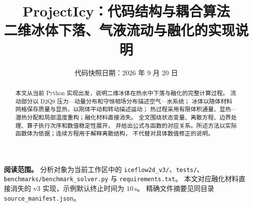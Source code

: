 \documentclass[UTF8,11pt,a4paper,fontset=none]{ctexart}
\title{\vspace{-12mm}\textbf{ProjectIcy：代码结构与耦合算法}\\[4mm]
  \large 二维冰体下落、气液流动与融化的实现说明}
\author{}
\date{代码快照日期：2026 年 9 月 20 日}
\newcommand{\code}[1]{\nolinkurl{#1}}
\numberwithin{equation}{section}
\begin{document}
\maketitle
\vspace{-8mm}
\begin{abstract}
本文从当前 Python 实现出发，说明二维冰体在热水中下落与融化的完整计算过程。
流动部分以 D2Q9 压力—动量分布和守恒相场分布描述空气—水系统；
冰体以随体材料网格保存质量与显热，以刚体平动和转动描述运动；
热过程采用有限体积通量、显热—潜热分配和局部温度重构；融化材料直接消失。
全文围绕状态变量、离散方程、边界处理、算子执行次序和数值稳定性展开，
并给出公式与函数的对应关系。所述方法以实际函数体为依据；连续方程用于解释离散结构，
不代替对具体数值修正的说明。
\end{abstract}
\noindent\textbf{阅读范围。}
分析对象为当前工作区中的 \code{iceflow2d_v3/}、\code{tests/}、
\code{benchmarks/benchmark_solver.py} 与 \code{requirements.txt}。
本文对应融化材料直接消失的 v3 实现，示例默认终止时间为 $10\,\mathrm s$。
精确文件摘要见同目录 \code{source_manifest.json}。

\begingroup
\small\linespread{1.0}\selectfont
\setlength{\parskip}{0pt}
\tableofcontents
\endgroup
\clearpage






\appendix

\end{document}
